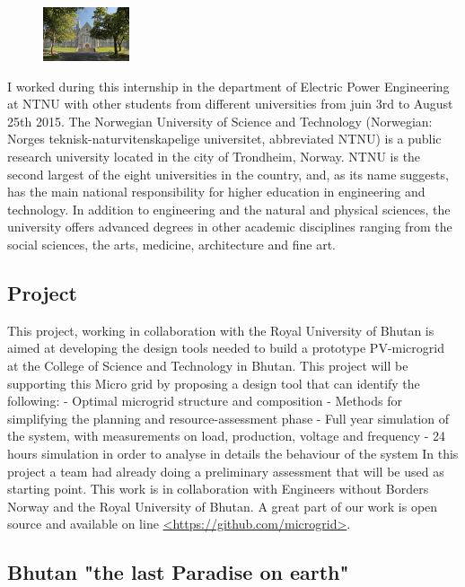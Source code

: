 \documentclass{article}
\begin{document}
\begin{figure}
    \includegraphics[width=1in]{picture/NTNU}
\end{figure}

I worked during this internship in the department of Electric Power Engineering at NTNU with other students from different universities from juin 3rd to August 25th 2015.
The Norwegian University of Science and Technology (Norwegian: Norges teknisk-naturvitenskapelige universitet, abbreviated NTNU) is a public research university located in the city of Trondheim, Norway. NTNU is the second largest of the eight universities in the country, and, as its name suggests, has the main national responsibility for higher education in engineering and technology. In addition to engineering and the natural and physical sciences, the university offers advanced degrees in other academic disciplines ranging from the social sciences, the arts, medicine, architecture and fine art.

\subsection{Project}

This project, working in collaboration with the Royal University of Bhutan is aimed at developing the design tools needed to build a prototype PV-microgrid at the College of Science and Technology in Bhutan. This project will be supporting this Micro grid by proposing a design tool that can identify the following:
- Optimal microgrid structure and composition
- Methods for simplifying the planning and resource-assessment phase
- Full year simulation of the system, with measurements on load, production, voltage and frequency
- 24 hours simulation in order to analyse in details the behaviour of the system
In this project a team had already doing a preliminary assessment that will be used as starting point.
This work is in collaboration with Engineers without Borders Norway and the Royal University of Bhutan.
A great part of our work is open source and available on line \url{<https://github.com/microgrid>}.

\subsection{Bhutan "the last Paradise on earth"}
\end{document}
